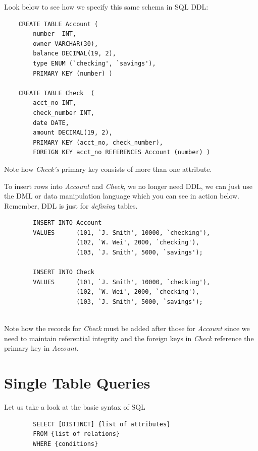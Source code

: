 \documentclass{article}
\begin{document}
Look below to see how we specify this same schema in SQL DDL:

\begin{tcolorbox}
    \begin{verbatim}
    CREATE TABLE Account (
        number  INT,
        owner VARCHAR(30),
        balance DECIMAL(19, 2),
        type ENUM (`checking', `savings'),
        PRIMARY KEY (number) )

    CREATE TABLE Check  (
        acct_no INT,
        check_number INT,
        date DATE,
        amount DECIMAL(19, 2),
        PRIMARY KEY (acct_no, check_number),
        FOREIGN KEY acct_no REFERENCES Account (number) )
    \end{verbatim}
    
\end{tcolorbox}
Note how \textit{Check's} primary key consists of more than one attribute.

To insert rows into \textit{Account} and \textit{Check}, we no longer need DDL, we can just use the DML or data manipulation language which you can see in action below. Remember, DDL is just for \textit{defining} tables.

\begin{tcolorbox}
    \begin{verbatim}
        INSERT INTO Account
        VALUES      (101, `J. Smith', 10000, `checking'),
                    (102, `W. Wei', 2000, `checking'),
                    (103, `J. Smith', 5000, `savings');

        INSERT INTO Check
        VALUES      (101, `J. Smith', 10000, `checking'),
                    (102, `W. Wei', 2000, `checking'),
                    (103, `J. Smith', 5000, `savings');
        
    \end{verbatim}
\end{tcolorbox}

Note how the records for \textit{Check} must be added after those for \textit{Account} since we need to maintain referential integrity and the foreign keys in \textit{Check} reference the primary key in \textit{Account}.

\section*{Single Table Queries}
Let us take a look at the basic syntax of SQL
\begin{tcolorbox}
    \begin{verbatim}
        SELECT [DISTINCT] {list of attributes}
        FROM {list of relations}
        WHERE {conditions}
    \end{verbatim}
\end{tcolorbox}
\end{document}
